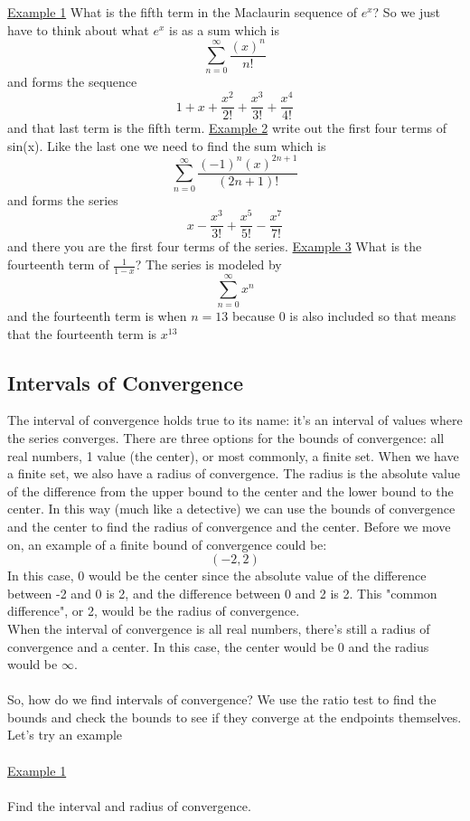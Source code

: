 \documentclass[a4paper,openright, 14pt]{article}
\begin{document}
\underline{Example 1}
What is the fifth term in the Maclaurin sequence of $e^x$? So we just have to think about what $e^x$ is as a sum which is $$\sum_{n=0} ^\infty \frac{(x)^n}{n!}$$ and forms the sequence $$1+x+\frac{x^2}{2!}+\frac{x^3}{3!}+\frac{x^4}{4!}$$ and that last term is the fifth term.
\underline{Example 2} write out the first four terms of sin(x).
Like the last one we need to find the sum which is $$\sum_{n=0} ^\infty \frac{(-1)^n(x)^{2n+1}}{(2n+1)!}$$ and forms the series 
$$x-\frac{x^3}{3!}+\frac{x^5}{5!}-\frac{x^7}{7!}$$ and there you are the first four terms of the series.
\underline{Example 3} What is the fourteenth term of $\frac{1}{1-x}$? The series is modeled by $$\sum_{n=0} ^\infty x^n$$ and the fourteenth term is when $n=13$ because 0 is also included so that means that the fourteenth term is $x^13$
\subsection*{Intervals of Convergence}
The interval of convergence holds true to its name: it's an interval of values where the series converges. There are three options for the bounds of convergence: all real numbers, 1 value (the center), or most commonly, a finite set. When we have a finite set, we also have a radius of convergence. The radius is the absolute value of the difference from the upper bound to the center and the lower bound to the center. In this way (much like a detective) we can use the bounds of convergence and the center to find the radius of convergence and the center. Before we move on, an example of a finite bound of convergence could be:
$$(-2,2)$$
In this case, 0 would be the center since the absolute value of the difference between -2 and 0 is 2, and the difference between 0 and 2 is 2. This "common difference", or 2, would be the radius of convergence.
\\
When the interval of convergence is all real numbers, there's still a radius of convergence and a center. In this case, the center would be 0 and the radius would be $\infty$.\\\\
So, how do we find intervals of convergence? We use the ratio test to find the bounds and check the bounds to see if they converge at the endpoints themselves. Let's try an example\\\\
\underline{Example 1}\\\\
Find the interval and radius of convergence. 
\end{document}
